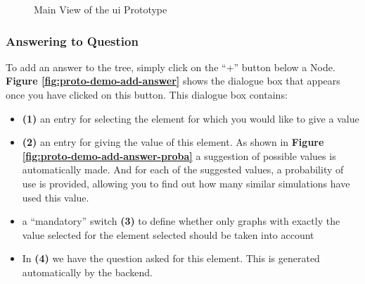     \begin{figure}[h]
    \centering
    \caption{\label{fig:proto-demo}  Main View of the \acrshort{ui} Prototype}
    \end{figure}
    
    
    \subsubsection{Answering to Question}
    To add an answer to the tree, simply click on the “+” button below a Node. \textbf{Figure \ref{fig:proto-demo-add-answer}} shows the dialogue box that appears once you have clicked on this button. This dialogue box contains:
    
    \begin{itemize}
        \item \textbf{(1)} an entry for selecting the element for which you would like to give a value
        \item \textbf{(2)} an entry for giving the value of this element. As shown in \textbf{Figure \ref{fig:proto-demo-add-answer-proba}} a suggestion of possible values is automatically made. And for each of the suggested values, a probability of use is provided, allowing you to find out how many similar simulations have used this value.
        \item a “mandatory” switch \textbf{(3)} to define whether only graphs with exactly the value selected for the element selected should be taken into account
        \item In \textbf{(4)} we have the question asked for this element. This is generated automatically by the backend.
    \end{itemize}
    

